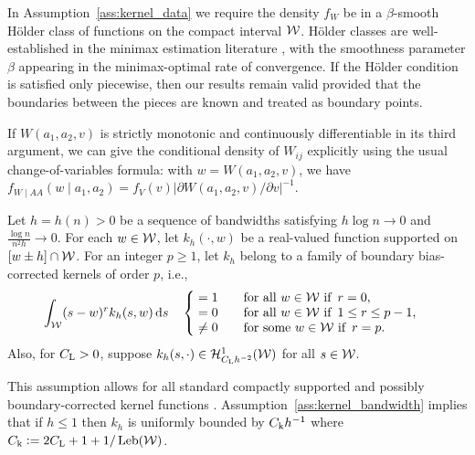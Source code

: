 In Assumption~\ref{ass:kernel_data} we require
the density $f_W$ be in a $\beta$-smooth H\"older class of
functions on the compact interval $\mathcal{W}$.
H\"older classes are well-established in the minimax estimation literature
\citep{gine2021mathematical}, with the smoothness parameter $\beta$ appearing
in the minimax-optimal rate of convergence.
If the H\"older condition is satisfied only piecewise,
then our results remain valid provided that the boundaries
between the pieces are known and treated as boundary points.

If $W(a_1, a_2, v)$ is strictly monotonic and continuously differentiable in
its third argument,
we can give the conditional density of $W_{i j}$ explicitly
using the usual change-of-variables formula: with $w=W(a_1,a_2,v)$,
we have
$f_{W \mid AA}(w \mid a_1,a_2) = f_V(v)
\big|\partial W(a_1,a_2,v)/\partial v\big|^{-1}$.

\begin{assumption}\label{ass:kernel_bandwidth}%
  \onehalfspacing

  Let $h = h(n) > 0$
  be a sequence of bandwidths
  satisfying $h \log n \to 0$
  and $\frac{\log n}{n^2h} \to 0$.
  For each $w \in \mathcal{W}$, let $k_h(\cdot, w)$
  be a real-valued function supported on
  $[w \pm h] \cap \mathcal{W}$.
  For an integer $p \geq 1$,
  let $k_h$ belong to a family of
  boundary bias-corrected kernels of order $p$, i.e.,
  \begin{align*}
    \int_{\mathcal{W}}
    (s-w)^r k_h(s,w) \,\mathrm{d}s
    \quad
    \begin{cases}
      \begin{alignedat}{2}
        &= 1 &\qquad &\text{for all } w \in \mathcal{W} \text{ if }\, r = 0, \\
        &= 0 & &\text{for all } w \in \mathcal{W} \text{ if }\, 1 \leq r \leq p-1, \\
        &\neq 0 & &\text{for some } w \in \mathcal{W} \text{ if }\, r = p.
      \end{alignedat}
    \end{cases}
  \end{align*}
  Also, for $C_\mathrm{L} > 0$,
  suppose $k_h(s, \cdot) \in \mathcal{H}^1_{C_\mathrm{L} h^{-2}}(\mathcal{W})$
  for all $s \in \mathcal{W}$.
\end{assumption}

This assumption allows for all standard compactly supported
and possibly boundary-corrected kernel functions
\citep{wand1994kernel,simonoff2012smoothing}.
Assumption~\ref{ass:kernel_bandwidth} implies that
if $h \leq 1$ then
$k_h$ is uniformly bounded by
$C_\mathrm{k} h^{-1}$ where $C_\mathrm{k} \vcentcolon = 2 C_\mathrm{L} + 1 + 1/\operatorname{Leb}(\mathcal{W})$.

